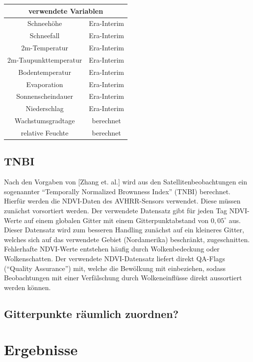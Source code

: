 \documentclass[]{article}
\begin{document}
\begin{tabular}{|c|c|}
	\multicolumn{2}{c}{verwendete Variablen}\\
	\hline
	Schneehöhe& Era-Interim\\
	\hline
	Schneefall& Era-Interim\\
	\hline
	2m-Temperatur& Era-Interim \\
	\hline
	2m-Taupunkttemperatur& Era-Interim\\
	\hline
	Bodentemperatur&Era-Interim\\
	\hline
	Evaporation& Era-Interim\\
	\hline
	Sonnenscheindauer& Era-Interim\\
	\hline
	Niederschlag& Era-Interim\\
	\hline
	Wachstumsgradtage& berechnet\\
	\hline
	relative Feuchte& berechnet\\
	\hline
\end{tabular}

\subsection{TNBI}
Nach den Vorgaben von [Zhang et. al.] wird aus den Satellitenbeobachtungen ein sogenannter \enquote{Temporally Normalized Brownness Index} (TNBI) berechnet. Hierfür werden die NDVI-Daten des AVHRR-Sensors verwendet. Diese müssen zunächst vorsortiert werden. Der verwendete Datensatz gibt für jeden Tag NDVI-Werte auf einem globalen Gitter mit einem Gitterpunktabstand von $0,05^\circ$ aus. Dieser Datensatz wird zum besseren Handling zunächst auf ein kleineres Gitter, welches sich auf das verwendete Gebiet (Nordamerika) beschränkt, zugeschnitten. Fehlerhafte NDVI-Werte entstehen häufig durch Wolkenbedeckung oder Wolkenschatten. Der verwendete NDVI-Datensatz liefert direkt QA-Flags (\enquote{Quality Assurance}) mit, welche die Bewölkung mit einbeziehen, sodass Beobachtungen mit einer Verfälschung durch Wolkeneinflüsse direkt aussortiert werden können.
\subsection{Gitterpunkte räumlich zuordnen?}
\section{Ergebnisse}
\end{document}
